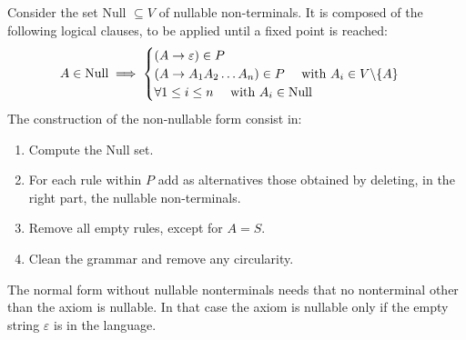 Consider the set Null $\subseteq V$ of nullable non-terminals. 
It is composed of the following logical clauses, to be applied until a fixed point is reached:
\[A \in \textnormal{Null} \implies
\begin{cases}
    (A \rightarrow \varepsilon) \in P\\
    (A \rightarrow A_1A_2\dots A_n) \in P \:\:\:\:\:\: \textnormal{with } A_i \in V \backslash \{A\} \\
    \forall 1 \leq i \leq n \:\:\:\:\:\: \textnormal{with } A_i \in \textnormal{Null}
\end{cases}    
\]
The construction of the non-nullable form consist in:
\begin{enumerate}
    \item Compute the Null set. 
    \item For each rule within $P$ add as alternatives those obtained by deleting, in the right part, the nullable non-terminals. 
    \item Remove all empty rules, except for $A=S$. 
    \item Clean the grammar and remove any circularity. 
\end{enumerate}
The normal form without nullable nonterminals needs that no nonterminal other than the axiom is nullable. 
In that case the axiom is nullable only if the empty string $\varepsilon$ is in the language. 












